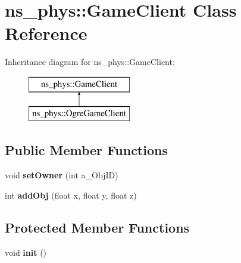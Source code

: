 \hypertarget{classns__phys_1_1_game_client}{}\section{ns\+\_\+phys\+:\+:Game\+Client Class Reference}
\label{classns__phys_1_1_game_client}
Inheritance diagram for ns\+\_\+phys\+:\+:Game\+Client\+:\begin{figure}[H]
\begin{center}
\leavevmode
\includegraphics[height=2.000000cm]{classns__phys_1_1_game_client}
\end{center}
\end{figure}
\subsection*{Public Member Functions}
\begin{DoxyCompactItemize}
\item 
void {\bfseries set\+Owner} (int a\+\_\+\+Obj\+ID)\hypertarget{classns__phys_1_1_game_client_a2c0d0495bca9fd4bd2874c831fe79111}{}\label{classns__phys_1_1_game_client_a2c0d0495bca9fd4bd2874c831fe79111}

\item 
int {\bfseries add\+Obj} (float x, float y, float z)\hypertarget{classns__phys_1_1_game_client_a24eae90325d2d48f7d23b3d803bd4674}{}\label{classns__phys_1_1_game_client_a24eae90325d2d48f7d23b3d803bd4674}

\end{DoxyCompactItemize}
\subsection*{Protected Member Functions}
\begin{DoxyCompactItemize}
\item 
void {\bfseries init} ()\hypertarget{classns__phys_1_1_game_client_a936958db4f2d7cb0519b3ffdb4919040}{}\label{classns__phys_1_1_game_client_a936958db4f2d7cb0519b3ffdb4919040}

\end{DoxyCompactItemize}
